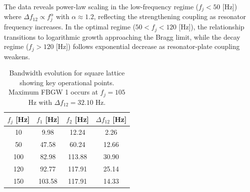 \documentclass[review,numbers,sort&compress]{elsarticle}
\begin{document}
The data reveals power-law scaling in the low-frequency regime ($f_j < 50$ [Hz]) where $\Delta f_{12} \propto f_j^{\alpha}$ with $\alpha \approx 1.2$, reflecting the strengthening coupling as resonator frequency increases. In the optimal regime ($50 < f_j < 120$ [Hz]), the relationship transitions to logarithmic growth approaching the Bragg limit, while the decay regime ($f_j > 120$ [Hz]) follows exponential decrease as resonator-plate coupling weakens.

\begin{table}[htb]
    \centering
    \caption{Bandwidth evolution for square lattice showing key operational points. Maximum FBGW 1 occurs at $f_j = 105$ Hz with $\Delta f_{12} = 32.10$ Hz.}
    \label{tab_square_latice_fbgw}
    \begin{tabular}{cccc}
        \hline
        $f_j$ [Hz] & $f_1$ [Hz] & $f_2$ [Hz] & $\Delta f_{12}$ [Hz] \\
        \hline
        10  & 9.98  & 12.24  & 2.26 \\
        50  & 47.58 & 60.24  & 12.66 \\
        100 & 82.98  & 113.88 & 30.90 \\
        120 & 92.77  & 117.91 & 25.14 \\
        150 & 103.58 & 117.91 & 14.33 \\
        \hline
    \end{tabular}
\end{table}
\end{document}
